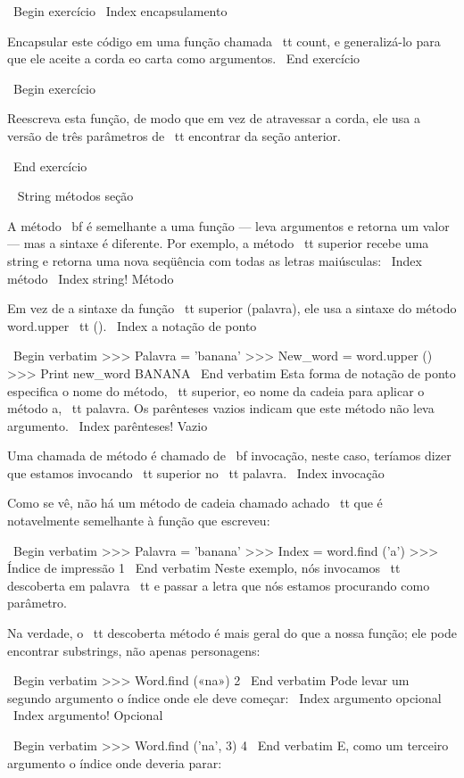 \documentclass[10pt]{book}
\begin{document}
{{{{{\ Begin {} exercício
\ Index {} encapsulamento

Encapsular este código em uma função chamada {\ tt
count}, e generalizá-lo para que ele aceite a corda eo
carta como argumentos.
\ End {} exercício

\ Begin {} exercício

Reescreva esta função, de modo que em vez de
atravessar a corda, ele usa a versão de três parâmetros de {\ tt
encontrar} da seção anterior.

\ End {} exercício


\ {} String métodos seção

A {método \ bf} é semelhante a uma função --- leva argumentos e
retorna um valor --- mas a sintaxe é diferente. Por exemplo, a
método {\ tt superior} recebe uma string e retorna uma nova seqüência com
todas as letras maiúsculas:
\ Index {método}
\ Index {string! Método}

Em vez de a sintaxe da função {\ tt superior (palavra)}, ele usa
a sintaxe do método {word.upper \ tt ()}.
\ Index {} a notação de ponto

\ Begin {verbatim}
>>> Palavra = 'banana'
>>> New_word = word.upper ()
>>> Print new_word
BANANA
\ End {verbatim}
%
Esta forma de notação de ponto especifica o nome do método, {\ tt
superior}, eo nome da cadeia para aplicar o método a, {\ tt
palavra}. Os parênteses vazios indicam que este método não leva
argumento.
\ Index {parênteses! Vazio}

Uma chamada de método é chamado de {\ bf invocação}, neste caso, teríamos
dizer que estamos invocando {\ tt superior} no {\ tt palavra}.
\ Index {} invocação

Como se vê, não há um método de cadeia chamado {achado \ tt} que
é notavelmente semelhante à função que escreveu:

\ Begin {verbatim}
>>> Palavra = 'banana'
>>> Index = word.find ('a')
>>> Índice de impressão
1
\ End {verbatim}
%
Neste exemplo, nós invocamos {\ tt descoberta} em {palavra \ tt} e passar
a letra que nós estamos procurando como parâmetro.

Na verdade, o {\ tt descoberta} método é mais geral do que a nossa função;
ele pode encontrar substrings, não apenas personagens:

\ Begin {verbatim}
>>> Word.find («na»)
2
\ End {verbatim}
%
Pode levar um segundo argumento o índice onde ele deve começar:
\ Index {argumento opcional}
\ Index {argumento! Opcional}

\ Begin {verbatim}
>>> Word.find ('na', 3)
4
\ End {verbatim}
%
E, como um terceiro argumento o índice onde deveria parar:

}}}}}
\end{document}

